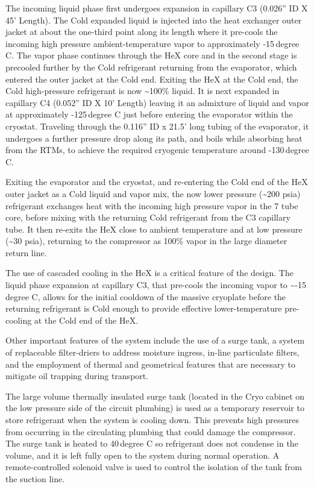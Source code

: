 The incoming liquid phase first undergoes expansion in capillary C3 (0.026'' ID X 45' Length). The Cold expanded liquid is injected into the heat exchanger outer jacket at about the one-third point along its length where it pre-cools the incoming high pressure ambient-temperature vapor to approximately -15\,degree C. The vapor phase continues through the HeX core and in the second stage is precooled further by the Cold refrigerant returning from the evaporator, which entered the outer jacket at the Cold end. Exiting the HeX at the Cold end, the Cold high-pressure refrigerant is now \textasciitilde100\% liquid. It is next expanded in capillary C4 (0.052'' ID X 10' Length) leaving it an admixture of liquid and vapor at approximately -125\,degree C just before entering the evaporator within the cryostat. Traveling through the 0.116'' ID x 21.5' long tubing of the evaporator, it undergoes a further pressure drop along its path, and boils while absorbing heat from the RTMs, to achieve the required cryogenic temperature around -130\,degree C.

Exiting the evaporator and the cryostat, and re-entering the Cold end of the HeX outer jacket as a Cold liquid and vapor mix, the now lower pressure (\textasciitilde200 psia) refrigerant exchanges heat with the incoming high pressure vapor in the 7 tube core, before mixing with the returning Cold refrigerant from the C3 capillary tube. It then re-exits the HeX close to ambient temperature and at low pressure (\textasciitilde30 psia), returning to the compressor as 100\% vapor in the large diameter return line.

The use of cascaded cooling in the HeX is a critical feature of the design. The liquid phase expansion at capillary C3, that pre-cools the incoming vapor to \textasciitilde-15\,degree C, allows for the initial cooldown of the massive cryoplate before the returning refrigerant is Cold enough to provide effective lower-temperature pre-cooling at the Cold end of the HeX.

Other important features of the system include the use of a surge tank, a system of replaceable filter-driers to address moisture ingress, in-line particulate filters, and the employment of thermal and geometrical features that are necessary to mitigate oil trapping during transport.

The large volume thermally insulated surge tank (located in the Cryo cabinet on the low pressure side of the circuit plumbing) is used as a temporary reservoir to store refrigerant when the system is cooling down. This prevents high pressures from occurring in the circulating plumbing that could damage the compressor. The surge tank is heated to 40\,degree C so refrigerant does not condense in the volume, and it is left fully open to the system during normal operation. A remote-controlled solenoid valve is used to control the isolation of the tank from the suction line.

